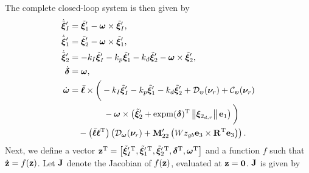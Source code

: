 The complete closed-loop system is then given by
\begin{subequations}
    \begin{align}
        \dot{\tilde{\bm{\xi}}}_I^{\prime} &= \tilde{\bm{\xi}}_1^{\prime} - \bm{\omega} \times \tilde{\bm{\xi}}_I^{\prime}, \\
        \dot{\tilde{\bm{\xi}}}_1^{\prime} &= \tilde{\bm{\xi}}_2^{\prime} - \bm{\omega} \times \tilde{\bm{\xi}}_1^{\prime}, \\
        \dot{\tilde{\bm{\xi}}}_2^{\prime} &= -k_I \tilde{\bm{\xi}}_I^{\prime} - k_p \tilde{\bm{\xi}}_1^{\prime} - k_d \tilde{\bm{\xi}}_2^{\prime} - \bm{\omega} \times \tilde{\bm{\xi}}_2^{\prime}, \\
        \dot{\bm{\delta}} &= \bm{\omega}, \\
        \dot{\bm{\omega}} &= \Bar{\boldsymbol{\ell}} \times \bigg(-k_I \tilde{\bm{\xi}}_I^{\prime} - k_p \tilde{\bm{\xi}}_1^{\prime} - k_d \tilde{\bm{\xi}}_2^{\prime} + \mathcal{D}_{\bm{\upsilon}}(\bm{\nu}_r) + \mathcal{C}_{\bm{\upsilon}}(\bm{\nu}_r) \nonumber \\
        &\qquad \qquad - \bm{\omega} \times \left(\tilde{\bm{\xi}}_2^{\prime} + {\rm expm}(\bm{\delta})^{\mathrm{T}} \left\|\bm{\xi}_{2_{d,r}}\right\|\mathbf{e}_1\right)\bigg) \nonumber \\
        &\quad - \left(\Bar{\boldsymbol{\ell}}\boldsymbol{\ell}^{\mathrm{T}}\right) \left(\mathcal{D}_{\bm{\omega}}(\bm{\nu}_r) + \mathbf{M}_{22}^{\prime}\left(Wz_{gb} \mathbf{e}_3 \times \mathbf{R}^{\mathrm{T}} \mathbf{e}_3\right)\right).
    \end{align}
\end{subequations}
Next, we define a vector $\mathbf{z}^{\mathrm{T}} = \left[{\tilde{\bm{\xi}}_I^{\prime\,{\rm T}}}, {\tilde{\bm{\xi}}_1^{\prime\,{\rm T}}}, {\tilde{\bm{\xi}}_2^{\prime\,{\rm T}}}, \bm{\delta}^{\mathrm{T}}, \bm{\omega}^{\mathrm{T}}\right]$ and a function $f$ such that $\dot{\mathbf{z}} = f(\mathbf{z})$.
Let $\mathbf{J}$ denote the Jacobian of $f(\mathbf{z})$, evaluated at $\mathbf{z} = \mathbf{0}$.
$\mathbf{J}$ is given by

